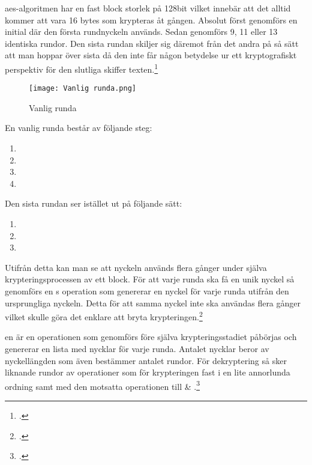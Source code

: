 \acrshort{aes}-algoritmen har en fast block storlek på 128bit vilket innebär att
det alltid kommer att vara 16 \glspl{byte} som krypteras åt gången. Absolut först genomförs
en initial  där den första rundnyckeln används.
Sedan genomförs 9, 11 eller 13 identiska rundor. Den sista rundan skiljer sig däremot från det andra
på så sätt att man hoppar över sista  då den inte får någon betydelse ur ett
kryptografiskt perspektiv för den slutliga skiffer texten.\footcite{daemen1999aes}

\begin{wrapfigure}{r}{0.5\textwidth}
    \centering
    \texttt{[image: Vanlig runda.png]}
    \caption{Vanlig runda}
    \label{fig:round-function}
\end{wrapfigure}

En vanlig runda består av följande steg:

\begin{enumerate}
    \item {}
    \item {}
    \item {}
    \item {}
\end{enumerate}

Den sista rundan ser istället ut på följande sätt:

\begin{enumerate}
    \item {}
    \item {}
    \item {}
\end{enumerate}

Utifrån detta kan man se att nyckeln används flera gånger under själva krypteringsprocessen av ett block.
För att varje runda ska få en unik nyckel så genomförs en s operation
som genererar en nyckel för varje runda utifrån den ursprungliga nyckeln. Detta för att samma nyckel
inte ska användas flera gånger vilket skulle göra det enklare att bryta krypteringen.\footcite{daemen1999aes}

en är en operationen som genomförs före själva krypteringsstadiet påbörjas
och genererar en lista med nycklar för varje runda. Antalet nycklar beror av nyckellängden som även bestämmer antalet rundor.
För dekryptering så sker liknande rundor av operationer som för krypteringen fast
i en lite annorlunda ordning samt med den motsatta operationen till  \& .\footcite{daemen1999aes}

